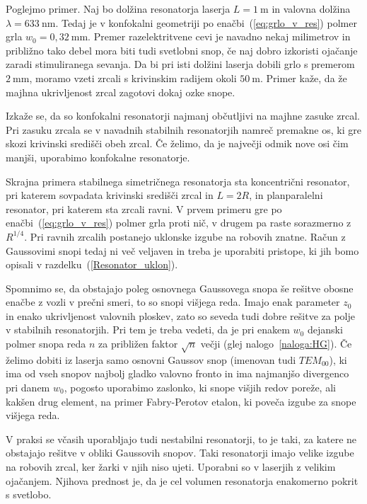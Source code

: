 Poglejmo primer. Naj bo dolžina resonatorja laserja $L=1~\si{\metre}$ in valovna
dolžina $\lambda = 633~\si{\nano\metre}$. Tedaj je v konfokalni geometriji po enačbi~(\ref{eq:grlo_v_res})
polmer grla $w_{0}=0,32~\si{\milli\metre}$. Premer razelektritvene cevi je navadno
nekaj milimetrov in približno tako debel mora biti tudi svetlobni
snop, če naj dobro izkoristi ojačanje zaradi stimuliranega sevanja.
Da bi pri isti dolžini laserja dobili grlo s premerom $2~\si{\milli\metre}$, moramo vzeti
zrcali s krivinskim radijem okoli $50~\si{\metre}$. Primer kaže, da že majhna ukrivljenost 
zrcal zagotovi dokaj ozke snope.

\begin{remark}
Izkaže se, da so konfokalni resonatorji najmanj občutljivi na majhne zasuke zrcal. 
Pri zasuku zrcala se v navadnih stabilnih resonatorjih namreč premakne os, ki gre skozi 
krivinski središči obeh zrcal. Če želimo, da je največji odmik nove osi čim
manjši, uporabimo konfokalne resonatorje. 
\end{remark}

Skrajna primera stabilnega simetričnega resonatorja sta 
koncentrični resonator,
pri katerem sovpadata krivinski središči zrcal in $L=2R$, in planparalelni 
resonator, pri katerem sta zrcali ravni.
V prvem primeru gre po enačbi~(\ref{eq:grlo_v_res}) polmer grla proti nič, v drugem pa raste sorazmerno
z $R^{1/4}$. Pri ravnih zrcalih postanejo uklonske
izgube na robovih znatne. Račun z Gaussovimi snopi tedaj ni več veljaven
in treba je uporabiti pristope, ki jih bomo opisali
v razdelku~(\ref{Resonator_uklon}).

Spomnimo se, da obstajajo poleg osnovnega Gaussovega
snopa še rešitve obosne enačbe z vozli v prečni smeri, to so snopi
višjega reda. Imajo enak parameter $z_{0}$ in enako ukrivljenost
valovnih ploskev, zato so seveda tudi dobre rešitve za polje v stabilnih
resonatorjih. Pri tem je treba vedeti, da je pri enakem $w_{0}$
dejanski polmer snopa reda $n$ za približen faktor $\sqrt{n}$ večji 
(glej nalogo~\ref{naloga:HG}). Če želimo dobiti iz laserja samo 
osnovni Gaussov snop (imenovan tudi $TEM_{00}$), ki ima od vseh snopov
najbolj gladko valovno fronto in ima najmanjšo 
divergenco pri danem $w_0$, pogosto uporabimo zaslonko, ki snope višjih redov poreže, 
ali kakšen drug element, na primer Fabry-Perotov etalon, ki poveča izgube za snope višjega reda.
 
\begin{remark}
V praksi se včasih uporabljajo tudi nestabilni resonatorji, to je
taki, za katere ne obstajajo rešitve v obliki Gaussovih snopov. Taki
resonatorji imajo velike izgube na robovih zrcal, ker žarki v njih niso ujeti. 
Uporabni so v laserjih z velikim ojačanjem. Njihova prednost je, da je cel
volumen resonatorja enakomerno pokrit s svetlobo.
\end{remark}

